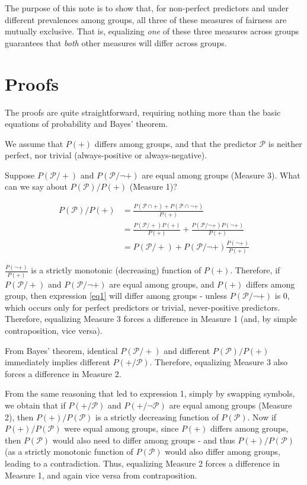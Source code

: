 \documentclass[twocolumn]{article}
\begin{document}
The purpose of this note is to show that, for non-perfect
predictors and under different prevalences among groups, all three of these measures of
fairness are mutually exclusive. That is,
equalizing \emph{one} of these three measures across groups guarantees that
\emph{both} other measures will differ across groups.

\section{Proofs}

The proofs are quite straightforward, requiring nothing more than the basic equations of probability and Bayes' theorem. 

We assume that $P(+)$ differs among groups, and that the predictor $\mathcal{P}$ is neither perfect, nor trivial (always-positive or always-negative). 

Suppose $P(\mathcal{P}/+)$ and $P(\mathcal{P}/\neg+)$ are equal among groups (Measure 3). What can we say about $P(\mathcal{P})/P(+)$ (Measure 1)?

\begin{align}
P(\mathcal{P})/P(+) &= \frac{P(\mathcal{P} \cap +) + P(\mathcal{P} \cap \neg +)}{P(+)} \nonumber\\
&= \frac{P(\mathcal{P} / +) P(+)}{P(+)} + \frac{P(\mathcal{P} / \neg +) P(\neg +)}{P(+)} \nonumber \\
&= P(\mathcal{P} / +) + P(\mathcal{P} / \neg +) \frac{P(\neg +)}{P(+) \label{eq1}}
\end{align}

$\frac{P(\neg +)}{P(+)}$ is a strictly monotonic (decreasing) function of $P(+)$. Therefore, if $P(\mathcal{P}/+)$ and $P(\mathcal{P}/\neg+)$ are equal among groups, and $P(+)$ differs among group, then expression \ref{eq1} will differ among groups - unless $P(\mathcal{P} / \neg +)$ is 0, which occurs only for perfect predictors or trivial, never-positive predictors. Therefore, equalizing Measure 3 forces a difference in Measure 1 (and, by simple contraposition, vice versa).

From Bayes' theorem, identical $P(\mathcal{P}/+)$ and different $P(\mathcal{P})/P(+)$ immediately implies different $P(+/\mathcal{P})$. Therefore, equalizing Measure 3 also forces a difference in Measure 2.

From the same reasoning that led to expression 1, simply by swapping symbols,
we obtain that if $P(+/\mathcal{P})$ and $P(+/\neg\mathcal{P})$ are equal among
groups (Measure 2), then $P(+)/P(\mathcal{P})$ is a strictly decreasing
function of $P(\mathcal{P})$. Now if $P(+)/P(\mathcal{P})$ were equal among
groups, since $P(+)$ differs among groups, then $P(\mathcal{P})$ would also
need to differ among groups - and thus $P(+)/P(\mathcal{P})$ (as a strictly monotonic
function of $P(\mathcal{P})$ would also differ among groups, leading to a
contradiction. Thus, equalizing Measure 2 forces a difference in Measure 1, and
again vice versa from contraposition.
\end{document}
